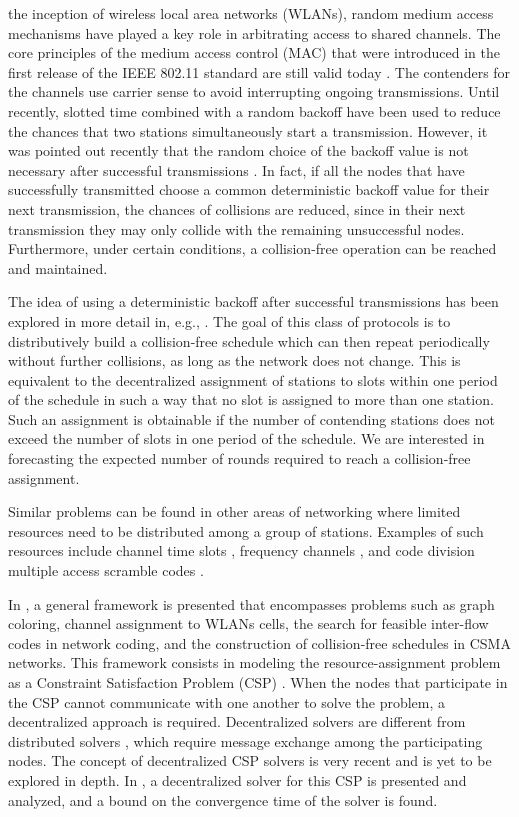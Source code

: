 \documentclass[journal]{IEEEtran}
\begin{document}
 the inception of wireless local area networks (WLANs), random medium access mechanisms have played a key role in arbitrating access to shared channels. The core principles of the medium access control (MAC) that were introduced in the first release of the IEEE 802.11 standard are still valid today \cite{IEEE80211-IEEESTD2007}. The contenders for the channels use carrier sense to avoid interrupting ongoing transmissions. Until recently, slotted time combined with a random backoff have been used to reduce the chances that two stations simultaneously start a transmission. However, it was pointed out recently that the random choice of the backoff value is not necessary after successful transmissions \cite{barcelo2008lba}.
In fact, if all the nodes that have successfully transmitted choose a common deterministic backoff value for their next transmission, the chances of collisions are reduced, since in their next transmission they may only collide with the remaining unsuccessful nodes. Furthermore, under certain conditions, a collision-free operation can be reached and maintained.

The idea of using a deterministic backoff after successful transmissions has been explored in more detail in, e.g., \cite{he2009srb,barcelo2011tcf,fang2011dlm,barcelo2010fcc}.
The goal of this class of protocols is to distributively build a collision-free schedule which can then repeat periodically without further collisions, as long as the network does not change. This is equivalent to the decentralized assignment of stations to slots within one period of the schedule in such a way that no slot is assigned to more than one station. Such an assignment is obtainable if the number of contending stations does not exceed the number of slots in one period of the schedule. We are interested in forecasting the expected number of rounds required to reach a collision-free assignment.


Similar problems can be found in other areas of networking where limited resources need to be distributed among a group of stations. Examples of such resources include channel time slots \cite{barcelo2008lba}, frequency channels \cite{duffy2011dcs}, and code division multiple access scramble codes \cite{checco2012scs}.

In \cite{duffy2011dcs}, a general framework is presented that encompasses problems such as graph coloring, channel assignment to WLANs cells, the search for feasible inter-flow codes in network coding, and the construction of collision-free schedules in CSMA networks.
This framework consists in modeling the resource-assignment problem as a Constraint Satisfaction Problem (CSP) \cite{tsang1993fcs}.
When the nodes that participate in the CSP cannot communicate with one another to solve the problem, a decentralized approach is required.
Decentralized solvers are different from distributed solvers \cite{yokoo2000adc}, which require message exchange among the participating nodes.
The concept of decentralized CSP solvers is very recent and is yet to be explored in depth.
In \cite{duffy2011dcs}, a decentralized solver for this CSP is presented and analyzed, and a bound on the convergence time of the solver is found.
\end{document}
